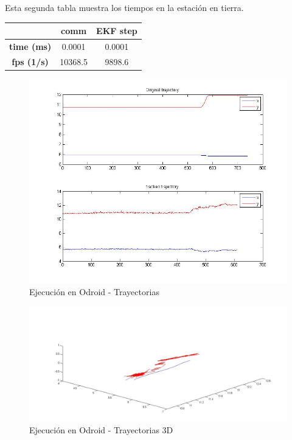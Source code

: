 		Esta segunda tabla muestra los tiempos en la estaci\'on en tierra.
		\newline
		
		{
		\centering
			\begin{tabular}{|c|c|c|}
			\hline  					&  comm		&  EKF step	\\
			\hline  \textbf{time (ms)}	& 	0.0001	& 	0.0001	\\
			\hline  \textbf{fps (1/s)}	&  	10368.5	&   9898.6 	\\
			\hline 
			\end{tabular} 
		}
		\newline
	\begin{figure}[ph]
		\centering
		\includegraphics[width=0.7\linewidth]{../Images/c4/arch_trajs_stero}
		\caption{Ejecuci\'on en Odroid - Trayectorias}
		\label{fig:arch_trajs_stero}
	\end{figure}
	
	\begin{figure}[ph]
		\centering
		\includegraphics[width=0.6\linewidth]{../Images/c4/arch_3d_trajs_stero}
		\caption{Ejecuci\'on en Odroid - Trayectorias 3D}
		\label{fig:arch_3d_trajs_stero}
	\end{figure}
